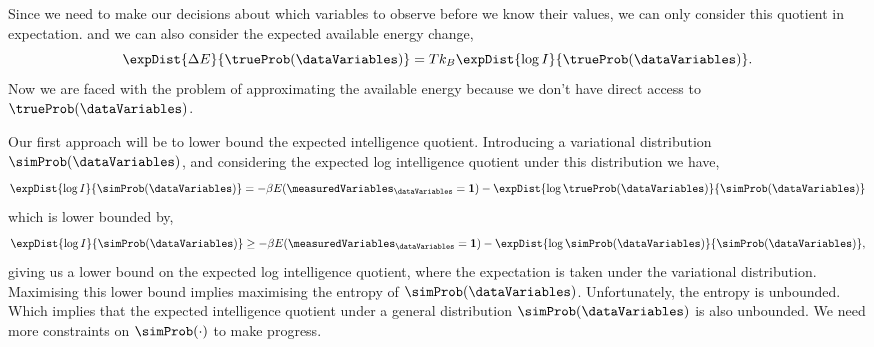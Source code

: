 
Since we need to make our decisions about which variables to observe
before we know their values, we can only consider this quotient in
expectation.  and we can also consider the expected available energy
change,
\[
\expDist{\Delta E}{\trueProb(\dataVariables)} = T k_B\expDist{\log I}{\trueProb(\dataVariables)}.
\]
Now we are faced with the problem of approximating the available
energy because we don't have direct access to
$\trueProb(\dataVariables)$.

Our first approach will be to lower bound the expected intelligence
quotient. Introducing a variational distribution
$\simProb(\dataVariables)$, and considering the expected log
intelligence quotient under this distribution we have,
\[
\expDist{\log I}{\simProb(\dataVariables)}   = - \beta E(\measuredVariables_\dataVariables=\textbf{1}) - \expDist{\log \trueProb(\dataVariables)}{\simProb(\dataVariables)}
\]
which is lower bounded by,
\begin{equation}
  \expDist{\log I}{\simProb(\dataVariables)} \geq - \beta
  E(\measuredVariables_\dataVariables=\textbf{1}) - \expDist{\log
    \simProb(\dataVariables)}{\simProb(\dataVariables)}, \label{eqn-lir-lower}
\end{equation}
giving us a lower bound on the expected log intelligence quotient,
where the expectation is taken under the variational
distribution. Maximising this lower bound implies maximising the
entropy of $\simProb(\dataVariables)$. Unfortunately, the entropy is
unbounded. Which implies that the expected intelligence quotient under
a general distribution $\simProb(\dataVariables)$ is also
unbounded. We need more constraints on $\simProb(\cdot)$ to make
progress.

